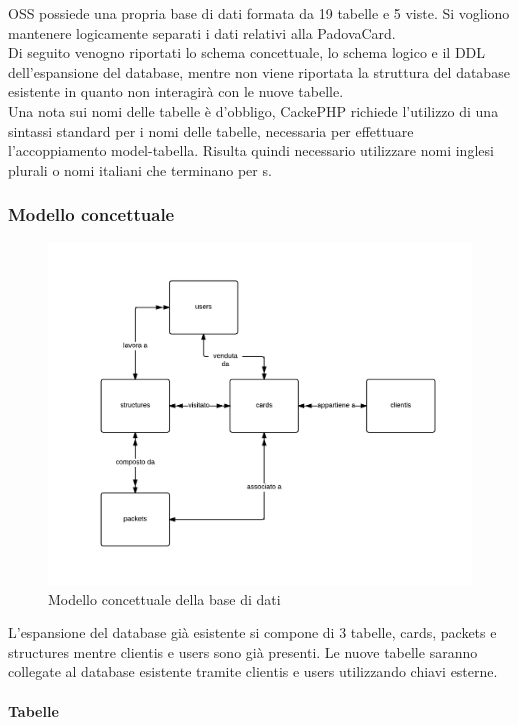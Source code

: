 OSS possiede una propria base di dati formata da 19 tabelle e 5 viste. Si vogliono mantenere logicamente separati i dati relativi alla PadovaCard.\\

Di seguito venogno riportati lo schema concettuale, lo schema logico e il DDL dell'espansione del database, mentre non viene riportata la struttura del database esistente in quanto non interagirà con le nuove tabelle.\\

Una nota sui nomi delle tabelle è d'obbligo, CackePHP richiede l'utilizzo di una sintassi standard per i nomi delle tabelle, necessaria per effettuare l'accoppiamento model-tabella. Risulta quindi necessario utilizzare nomi inglesi plurali o nomi italiani che terminano per s.
\subsubsection{Modello concettuale}
\begin{figure}[H]
\centering
\includegraphics[width=1\textwidth]{images/concettuale.png}
\caption{Modello concettuale della base di dati}
\end{figure}
L'espansione del database già esistente si compone di 3 tabelle, cards, packets e structures mentre clientis e users sono già presenti.
Le nuove tabelle saranno collegate al database esistente tramite clientis e users utilizzando chiavi esterne.\\ \\
\textbf{Tabelle}
